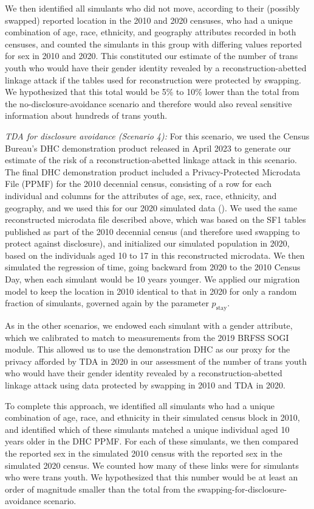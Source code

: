 \documentclass{jpc} %
\theoremstyle{plain}\newtheorem{satz}[thm]{Satz} %
\begin{document}
We then identified all simulants who did not move, according to their (possibly swapped) reported location in the 2010 and 2020 censuses, who had a unique combination of age, race, ethnicity, and geography attributes recorded in both censuses, and counted the simulants in this group with differing values reported for sex in 2010 and 2020.  This constituted our estimate of the number of trans youth who would have their gender identity revealed by a reconstruction-abetted linkage attack if the tables used for reconstruction were protected by swapping.  We hypothesized that this total would be 5\% to 10\% lower than the total from the no-disclosure-avoidance scenario and therefore would also reveal sensitive information about hundreds of trans youth.

\emph{TDA for disclosure avoidance (Scenario 4):} For this scenario, we used the Census Bureau's DHC demonstration product released in April 2023 to generate our estimate of the risk of a reconstruction-abetted linkage attack in this scenario.  The final DHC demonstration product included a Privacy-Protected Microdata File (PPMF) for the 2010 decennial census, consisting of a row for each individual and columns for the attributes of age, sex, race, ethnicity, and geography, and we used this for our 2020 simulated data (\cite{census2023demonstration}). We used the same reconstructed microdata file described above, which was based on the SF1 tables published as part of the 2010 decennial census (and therefore used swapping to protect against disclosure), and initialized our simulated population in 2020, based on the individuals aged 10 to 17 in this reconstructed microdata.  We then simulated the regression of time, going backward from 2020 to the 2010 Census Day, when each simulant would be 10 years younger.  We applied our migration model to keep the location in 2010 identical to that in 2020 for only a random fraction of simulants, governed again by the parameter $p_{\text{stay}}$.

As in the other scenarios, we endowed each simulant with a gender attribute, which we calibrated to match to measurements from the 2019 BRFSS SOGI module. This allowed us to use the demonstration DHC as our proxy for the privacy afforded by TDA in 2020 in our assessment of the number of trans youth who would have their gender identity revealed by a reconstruction-abetted linkage attack using data protected by swapping in 2010 and TDA in 2020.

To complete this approach, we identified all simulants who had a unique combination of age, race, and ethnicity in their simulated census block in 2010, and identified which of these simulants matched a unique individual aged 10 years older in the DHC PPMF.  For each of these simulants, we then compared the reported sex in the simulated 2010 census with the reported sex in the simulated 2020 census. We counted how many of these links were for simulants who were trans youth.  We hypothesized that this number would be at least an order of magnitude smaller than the total from the swapping-for-disclosure-avoidance scenario.
\end{document}
